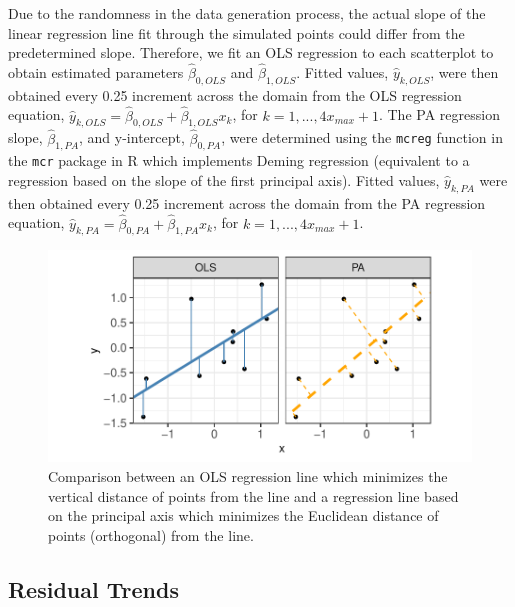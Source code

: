 \documentclass[12pt]{article}
\begin{document}
Due to the randomness in the data generation process, the actual slope
of the linear regression line fit through the simulated points could
differ from the predetermined slope. Therefore, we fit an OLS regression
to each scatterplot to obtain estimated parameters \(\hat\beta_{0,OLS}\)
and \(\hat\beta_{1,OLS}\). Fitted values, \(\hat y_{k,OLS}\), were then
obtained every 0.25 increment across the domain from the OLS regression
equation,
\(\hat y_{k,OLS} = \hat\beta_{0,OLS} + \hat\beta_{1,OLS} x_k\), for
\(k = 1, ..., 4 x_{max} +1\). The PA regression slope,
\(\hat\beta_{1,PA}\), and y-intercept, \(\hat\beta_{0,PA}\), were
determined using the \texttt{mcreg} function in the \texttt{mcr} package
in R \citep{mcr_pkg} which implements Deming regression (equivalent to a
regression based on the slope of the first principal axis). Fitted
values, \(\hat y_{k,PA}\) were then obtained every 0.25 increment across
the domain from the PA regression equation,
\(\hat y_{k,PA} = \hat\beta_{0,PA} + \hat\beta_{1,PA} x_k\), for
\(k = 1, ..., 4 x_{max} +1\).

\begin{figure}[tbp]

{\centering \includegraphics[width=0.8\linewidth,]{Eye-Fitting-Straight-Lines-in-the-Modern-Era_files/figure-latex/ols-vs-pca-example-1} 

}

\caption{ Comparison between an OLS regression line which minimizes the vertical distance of points from the line and a regression line based on the principal axis which minimizes the Euclidean distance of points (orthogonal) from the line.}\label{fig:ols-vs-pca-example}
\end{figure}

\hypertarget{residual-trends}{%
\subsection{Residual Trends}\label{residual-trends}}
\end{document}
